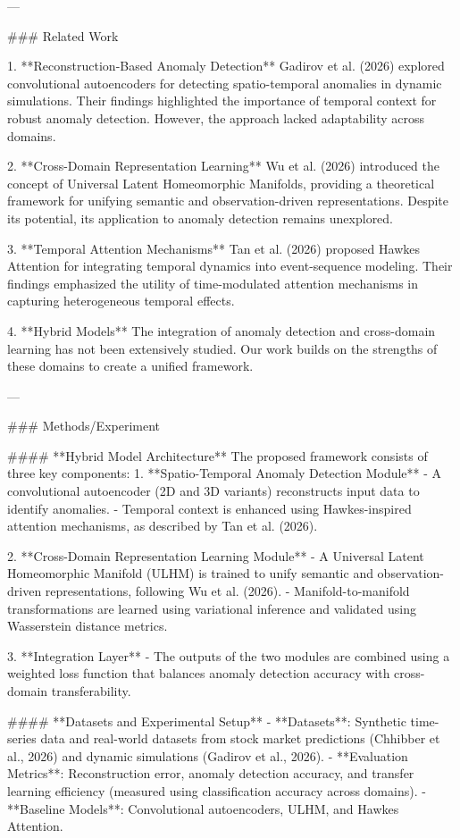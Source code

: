 ---

### Related Work  

1. **Reconstruction-Based Anomaly Detection**  
   Gadirov et al. (2026) explored convolutional autoencoders for detecting spatio-temporal anomalies in dynamic simulations. Their findings highlighted the importance of temporal context for robust anomaly detection. However, the approach lacked adaptability across domains.

2. **Cross-Domain Representation Learning**  
   Wu et al. (2026) introduced the concept of Universal Latent Homeomorphic Manifolds, providing a theoretical framework for unifying semantic and observation-driven representations. Despite its potential, its application to anomaly detection remains unexplored.

3. **Temporal Attention Mechanisms**  
   Tan et al. (2026) proposed Hawkes Attention for integrating temporal dynamics into event-sequence modeling. Their findings emphasized the utility of time-modulated attention mechanisms in capturing heterogeneous temporal effects.

4. **Hybrid Models**  
   The integration of anomaly detection and cross-domain learning has not been extensively studied. Our work builds on the strengths of these domains to create a unified framework.

---

### Methods/Experiment  

#### **Hybrid Model Architecture**  
The proposed framework consists of three key components:  
1. **Spatio-Temporal Anomaly Detection Module**  
   - A convolutional autoencoder (2D and 3D variants) reconstructs input data to identify anomalies.  
   - Temporal context is enhanced using Hawkes-inspired attention mechanisms, as described by Tan et al. (2026).  

2. **Cross-Domain Representation Learning Module**  
   - A Universal Latent Homeomorphic Manifold (ULHM) is trained to unify semantic and observation-driven representations, following Wu et al. (2026).  
   - Manifold-to-manifold transformations are learned using variational inference and validated using Wasserstein distance metrics.  

3. **Integration Layer**  
   - The outputs of the two modules are combined using a weighted loss function that balances anomaly detection accuracy with cross-domain transferability.

#### **Datasets and Experimental Setup**  
- **Datasets**: Synthetic time-series data and real-world datasets from stock market predictions (Chhibber et al., 2026) and dynamic simulations (Gadirov et al., 2026).  
- **Evaluation Metrics**: Reconstruction error, anomaly detection accuracy, and transfer learning efficiency (measured using classification accuracy across domains).  
- **Baseline Models**: Convolutional autoencoders, ULHM, and Hawkes Attention.  

